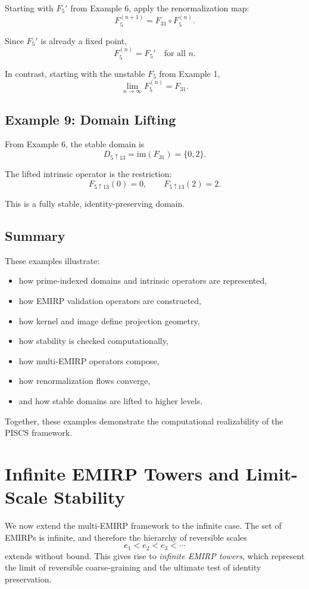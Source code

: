\documentclass[11pt]{article}
\theoremstyle{definition}
\theoremstyle{plain}
\theoremstyle{remark}
\begin{document}
Starting with $F_5'$ from Example 6, apply the renormalization map:
\[
F_5^{(n+1)} = F_{31} \circ F_5^{(n)}.
\]

Since $F_5'$ is already a fixed point,
\[
F_5^{(n)} = F_5'
\quad \text{for all } n.
\]

In contrast, starting with the unstable $F_5$ from Example 1,
\[
\lim_{n \to \infty} F_5^{(n)} = F_{31}.
\]

\subsection{Example 9: Domain Lifting}

From Example 6, the stable domain is
\[
D_{5 \uparrow 13} = \mathrm{im}(F_{31}) = \{0,2\}.
\]

The lifted intrinsic operator is the restriction:
\[
F_{5 \uparrow 13}(0) = 0, \qquad F_{5 \uparrow 13}(2) = 2.
\]

This is a fully stable, identity-preserving domain.

\subsection{Summary}

These examples illustrate:

\begin{itemize}
    \item how prime-indexed domains and intrinsic operators are represented,
    \item how EMIRP validation operators are constructed,
    \item how kernel and image define projection geometry,
    \item how stability is checked computationally,
    \item how multi-EMIRP operators compose,
    \item how renormalization flows converge,
    \item and how stable domains are lifted to higher levels.
\end{itemize}

Together, these examples demonstrate the computational realizability of
the PISCS framework.

\section{Infinite EMIRP Towers and Limit-Scale Stability}

We now extend the multi-EMIRP framework to the infinite case. The set of
EMIRPs is infinite, and therefore the hierarchy of reversible scales
\[
e_1 < e_2 < e_3 < \cdots
\]
extends without bound. This gives rise to \emph{infinite EMIRP towers},
which represent the limit of reversible coarse-graining and the ultimate
test of identity preservation.
\end{document}
